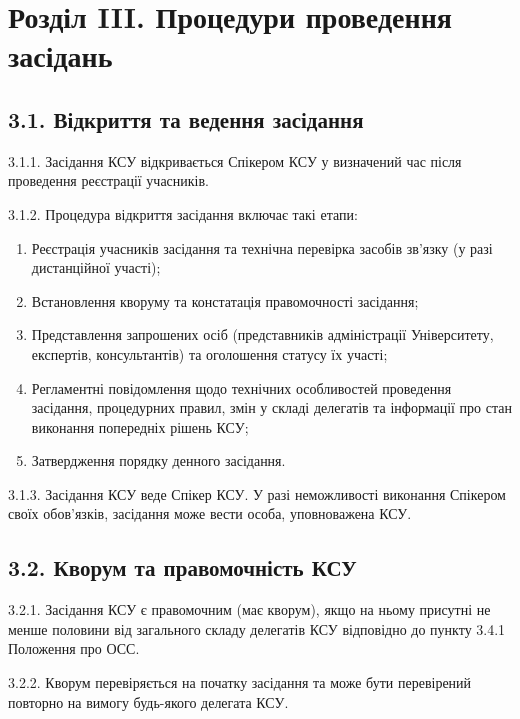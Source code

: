 \section*{Розділ III. Процедури проведення засідань}

\subsection*{3.1. Відкриття та ведення засідання}
    3.1.1. Засідання КСУ відкривається Спікером КСУ у визначений час після проведення реєстрації учасників.

    3.1.2. Процедура відкриття засідання включає такі етапи:

        \begin{enumerate}[label=\alph*)]
            \item Реєстрація учасників засідання та технічна перевірка засобів зв'язку (у разі дистанційної участі);
            \item Встановлення кворуму та констатація правомочності засідання;
            \item Представлення запрошених осіб (представників адміністрації Університету, експертів, консультантів) та оголошення статусу їх участі;
            \item Регламентні повідомлення щодо технічних особливостей проведення засідання, процедурних правил, змін у складі делегатів та інформації про стан виконання попередніх рішень КСУ;
            \item Затвердження порядку денного засідання.
        \end{enumerate}

    3.1.3. Засідання КСУ веде Спікер КСУ. У разі неможливості виконання Спікером своїх обов'язків, засідання може вести особа, уповноважена КСУ.

\subsection*{3.2. Кворум та правомочність КСУ}
    3.2.1. Засідання КСУ є правомочним (має кворум), якщо на ньому присутні не менше половини від загального складу делегатів КСУ відповідно до пункту 3.4.1 Положення про ОСС.

    3.2.2. Кворум перевіряється на початку засідання та може бути перевірений повторно на вимогу будь-якого делегата КСУ.

